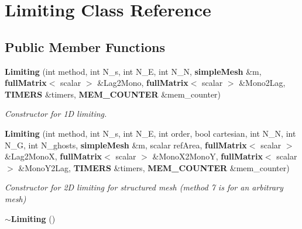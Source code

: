 \section{Limiting Class Reference}
\label{classLimiting}
\subsection*{Public Member Functions}
\begin{DoxyCompactItemize}
\item 
{\bf Limiting} (int method, int N\-\_\-s, int N\-\_\-\-E, int N\-\_\-\-N, {\bf simple\-Mesh} \&m, {\bf full\-Matrix}$<$ scalar $>$ \&Lag2\-Mono, {\bf full\-Matrix}$<$ scalar $>$ \&Mono2\-Lag, {\bf T\-I\-M\-E\-R\-S} \&timers, {\bf M\-E\-M\-\_\-\-C\-O\-U\-N\-T\-E\-R} \&mem\-\_\-counter)\label{classLimiting_a9d6ab8cfbc95257f60dc63daa6600918}

\begin{DoxyCompactList}\small\item\em Constructor for 1\-D limiting. \end{DoxyCompactList}\item 
{\bf Limiting} (int method, int N\-\_\-s, int N\-\_\-\-E, int order, bool cartesian, int N\-\_\-\-N, int N\-\_\-\-G, int N\-\_\-ghosts, {\bf simple\-Mesh} \&m, scalar ref\-Area, {\bf full\-Matrix}$<$ scalar $>$ \&Lag2\-Mono\-X, {\bf full\-Matrix}$<$ scalar $>$ \&Mono\-X2\-Mono\-Y, {\bf full\-Matrix}$<$ scalar $>$ \&Mono\-Y2\-Lag, {\bf T\-I\-M\-E\-R\-S} \&timers, {\bf M\-E\-M\-\_\-\-C\-O\-U\-N\-T\-E\-R} \&mem\-\_\-counter)\label{classLimiting_a4c5ec2dc8c2c9d048f9a5f87e89d70a4}

\begin{DoxyCompactList}\small\item\em Constructor for 2\-D limiting for structured mesh (method 7 is for an arbitrary mesh) \end{DoxyCompactList}\item 
{\bf $\sim$\-Limiting} ()\label{classLimiting_a5db475cb481018398d619da2029fb7d6}


\end{DoxyCompactItemize}
